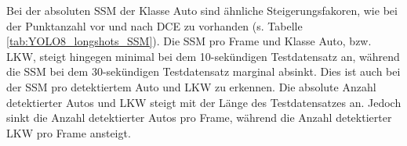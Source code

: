 {\begin{table}[h]
\begin{tabular}{l|l|l|l}
			\end{tabular}
			\end{table}
	Bei der absoluten SSM der Klasse Auto sind ähnliche Steigerungsfakoren, wie bei der Punktanzahl vor und nach DCE zu vorhanden (s. Tabelle \ref{tab:YOLO8_longshots_SSM}). Die SSM pro Frame und Klasse Auto, bzw. LKW, steigt hingegen minimal bei dem 10-sekündigen Testdatensatz an, während die SSM bei dem 30-sekündigen Testdatensatz marginal absinkt. Dies ist auch bei der SSM pro detektiertem Auto und LKW zu erkennen. Die absolute Anzahl detektierter Autos und LKW steigt mit der Länge des Testdatensatzes an. Jedoch sinkt die Anzahl detektierter Autos pro Frame, während die Anzahl detektierter LKW pro Frame ansteigt.\\
	

		
	
}



